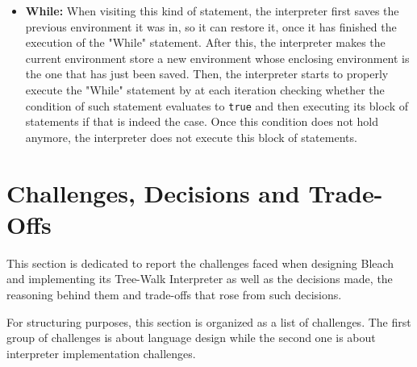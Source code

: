 \begin{itemize}
    \item \textbf{While:} When visiting this kind of statement, the interpreter first saves the previous environment it was in, so it can restore it, once it has finished the execution of the "While" statement. After this, the interpreter makes the current environment store a new environment whose enclosing environment is the one that has just been saved. Then, the interpreter starts to properly execute the "While" statement by at each iteration checking whether the condition of such statement evaluates to \texttt{true} and then executing its block of statements if that is indeed the case. Once this condition does not hold anymore, the interpreter does not execute this block of statements.

\end{itemize}

\section{Challenges, Decisions and Trade-Offs}
This section is dedicated to report the challenges faced when designing Bleach and implementing its Tree-Walk Interpreter as well as the decisions made, the reasoning behind them and trade-offs that rose from such decisions.

For structuring purposes, this section is organized as a list of challenges. The first group of challenges is about language design while the second one is about interpreter implementation challenges.

